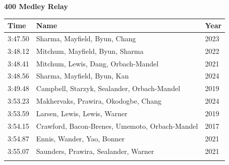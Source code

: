 \vspace{1.2em}
\noindent\begin{minipage}[t]{0.98\textwidth}
\centering
\textbf{\textcolor{teamprimary}{400 Medley Relay}}\par
\vspace{0.5em}
\centering
\small
\renewcommand{\arraystretch}{1.0}
\setlength{\tabcolsep}{4pt}
\begin{tabular}{@{}p{4.5cm}p{8.5cm}p{2.5cm}@{}}
\toprule
\textbf{Time} & \textbf{Name} & \textbf{Year} \\
\midrule
3:47.50 & Sharma, Mayfield, Byun, Chang & 2023 \\
3:48.12 & Mitchum, Mayfield, Byun, Sharma & 2022 \\
3:48.41 & Mitchum, Lewis, Dang, Orbach-Mandel & 2021 \\
3:48.56 & Sharma, Mayfield, Byun, Kan & 2024 \\
3:49.48 & Campbell, Starzyk, Sealander, Orbach-Mandel & 2019 \\
3:53.23 & Makhervaks, Prawira, Okodogbe, Chang & 2024 \\
3:53.59 & Larsen, Lewis, Lewis, Warner & 2019 \\
3:54.15 & Crawford, Bacon-Brenes, Umemoto, Orbach-Mandel & 2017 \\
3:54.87 & Ennis, Wander, Yao, Bonner & 2021 \\
3:55.07 & Saunders, Prawira, Sealander, Warner & 2021 \\
\bottomrule
\vspace{0.5em}
\end{tabular}
\end{minipage}
\clearpage

